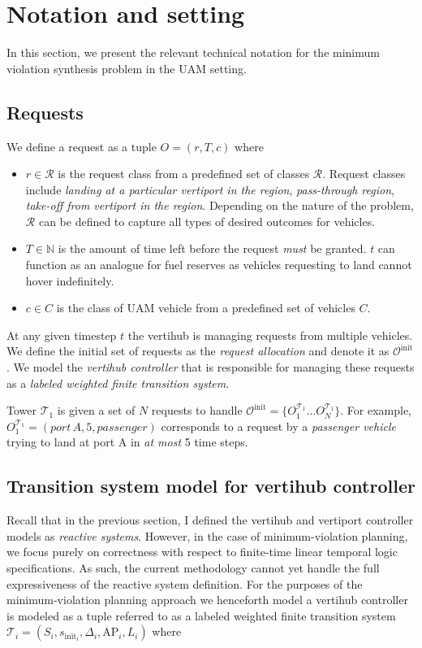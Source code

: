 \section{Notation and setting}\label{sec:background}
In this section, we present the relevant technical notation for the minimum violation synthesis problem in the UAM setting. 

%

\subsection{Requests}
We define a request as a tuple $ O = \left(r,T,c \right)$ where
\begin{itemize}
    \item $r \in \mathcal{R}$ is the request class from a predefined set of classes $
    \mathcal{R}$. Request classes include \emph{landing at a particular vertiport in the region}, \emph{pass-through region}, \emph{take-off from vertiport in the region}. Depending on the nature of the problem, $\mathcal{R}$ can be defined to capture all types of desired outcomes for vehicles.   
    \item $T \in \mathbb{N}$ is the amount of time left before the request \emph{must} be granted. $t$ can function as an analogue for fuel reserves as vehicles requesting to land cannot hover indefinitely. 
    \item $c \in C$ is the class of UAM vehicle from a predefined set of vehicles $C$.  
\end{itemize}
At any given timestep $t$ the vertihub is managing requests from multiple vehicles.  We define the initial set of requests as the \emph{request allocation} and denote it as $\mathcal{O}^{\text{init}}$. We model the \emph{vertihub controller} that is responsible for managing these requests as a 
\emph{labeled weighted finite transition system}. 
\begin{eg}
Tower $\mathcal{T}_1$ is given a set of $N$ requests to handle $\mathcal{O}^{\text{init}} = \{O^{\mathcal{T}_1}_1 \dots O^{\mathcal{T}_1}_N \}$. For example, $O^{\mathcal{T}_1}_1 = \left(port\, A, 5, passenger \right)$ corresponds to a request by a \emph{passenger vehicle} trying to land at port A in \emph{at most} 5 time steps. 
\end{eg}




\subsection{Transition system model for vertihub controller}
Recall that in the previous section, I defined the vertihub and vertiport controller models as \emph{reactive systems}. However, in the case of minimum-violation planning, we focus purely on correctness with respect to finite-time linear temporal logic specifications. As such, the current methodology cannot yet handle the full expressiveness of the reactive system definition. For the purposes of the minimum-violation planning approach we henceforth model a vertihub controller is modeled as a tuple referred to as a labeled weighted finite transition system $\mathcal{T}_i = \left(S_i, s_{\text{init}_i},\Delta_i, \text{AP}_i,L_i \right)$ where

